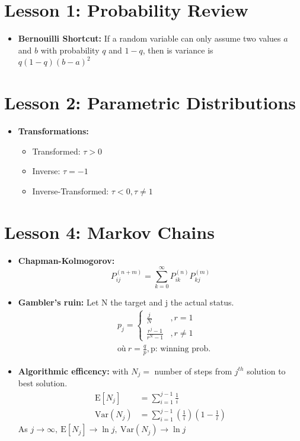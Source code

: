 \documentclass[10pt, french]{article}
\begin{document}
\small
\begin{multicols*}{3} %
\def\SectionColor{magenta!80!white}
\section*{Lesson 1: Probability Review}
\begin{itemize}[align=left,leftmargin=*]
    \item \textbf{Bernouilli Shortcut:} If a random variable can only assume two values $a$ and $b$ with probability $q$ and $1-q$, then is variance is \\ $q(1-q)(b-a)^2$
\end{itemize}

\section*{Lesson 2: Parametric Distributions}
\begin{itemize}[align=left,leftmargin=*]
    \item \textbf{Transformations:}
    \begin{itemize}
        \item Transformed: $\tau > 0$
        \item Inverse: $\tau = -1$
        \item Inverse-Transformed: $\tau < 0, \tau \neq 1$
    \end{itemize}
\end{itemize}

\def\SectionColor{brown!80!white}
\section*{Lesson 4: Markov Chains}
\begin{itemize}[align=left,leftmargin=*]
    \item \textbf{Chapman-Kolmogorov:} \[ P_{ij}^{(n+m)} = \sum_{k=0}^\infty P_{ik}^{(n)}  P_{kj}^{(m)} \]
    \item \textbf{Gambler's ruin:} Let N the target and j the actual status.
    \begin{align*}
        &p_j=
        \left\{
        \begin{array}{cc}
        \frac{j}{N} & ,r=1  \\
        \frac{r^j-1}{r^N-1} & ,r \neq 1
        \end{array}
        \right. \\
        & \text{où}\: r = \frac{q}{p}, \text{p: winning prob.}
    \end{align*}
    \item \textbf{Algorithmic efficency:} with $N_j=$ number of steps from $j^{th}$ solution to best solution.
    \begin{align*}
        \mathrm{E}[N_j] &= \sum_{i=1}^{j-1} \frac{1}{i} \\
        \text{Var}(N_j) &= \sum_{i=1}^{j-1} \left( \frac{1}{i} \right) \left(1 -  \frac{1}{i} \right)
    \end{align*}
    As $j \rightarrow \infty,\: \mathrm{E}[N_j] \rightarrow \ln j,\: \text{Var}(N_j) \rightarrow \ln j$
\end{itemize}


\end{multicols*}
\end{document}
